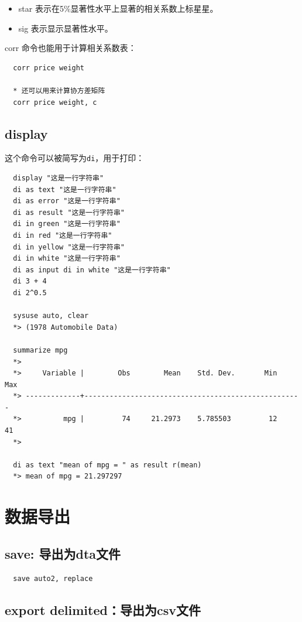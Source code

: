 \documentclass[cn,fancy,blue,11pt]{elegantbook}
\begin{document}
\begin{itemize}
  \item  star 表示在5\%显著性水平上显著的相关系数上标星星。
  \item  sig 表示显示显著性水平。
\end{itemize}

corr 命令也能用于计算相关系数表：

\begin{lstlisting}
  corr price weight

  * 还可以用来计算协方差矩阵
  corr price weight, c
\end{lstlisting}

\subsection{display}

这个命令可以被简写为\texttt{di}，用于打印：

\begin{lstlisting}
  display "这是一行字符串"
  di as text "这是一行字符串"
  di as error "这是一行字符串"
  di as result "这是一行字符串"
  di in green "这是一行字符串"
  di in red "这是一行字符串"
  di in yellow "这是一行字符串"
  di in white "这是一行字符串"
  di as input di in white "这是一行字符串"
  di 3 + 4
  di 2^0.5

  sysuse auto, clear
  *> (1978 Automobile Data)

  summarize mpg
  *>
  *>     Variable |        Obs        Mean    Std. Dev.       Min        Max
  *> -------------+----------------------------------------------------
  *>          mpg |         74     21.2973    5.785503         12         41
  *>

  di as text "mean of mpg = " as result r(mean)
  *> mean of mpg = 21.297297
\end{lstlisting}

\section{数据导出}
\subsection{save: 导出为dta文件}

\begin{lstlisting}
  save auto2, replace
\end{lstlisting}

\subsection{export delimited：导出为csv文件}
\end{document}
